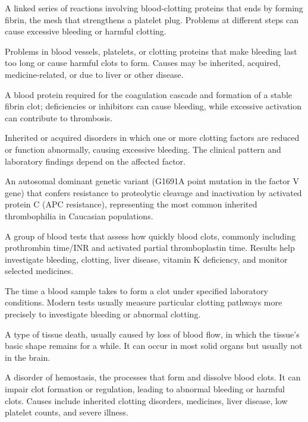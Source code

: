  A linked series of reactions involving blood-clotting proteins that ends by forming fibrin, the mesh that strengthens a platelet plug. Problems at different steps can cause excessive bleeding or harmful clotting.

 Problems in blood vessels, platelets, or clotting proteins that make bleeding last too long or cause harmful clots to form. Causes may be inherited, acquired, medicine-related, or due to liver or other disease.

 A blood protein required for the coagulation cascade and formation of a stable fibrin clot; deficiencies or inhibitors can cause bleeding, while excessive activation can contribute to thrombosis.

 Inherited or acquired disorders in which one or more clotting factors are reduced or
function abnormally, causing excessive bleeding. The clinical pattern and laboratory
findings depend on the affected factor.

 An autosomal dominant genetic variant (G1691A point mutation in the factor V gene) that confers resistance to proteolytic cleavage and inactivation by activated protein C (APC resistance), representing the most common inherited thrombophilia in Caucasian populations.

 A group of blood tests that assess how quickly blood clots, commonly including prothrombin time/INR and activated partial thromboplastin time. Results help investigate bleeding, clotting, liver disease, vitamin K deficiency, and monitor selected medicines.

 The time a blood sample takes to form a clot under specified laboratory conditions. Modern tests usually measure particular clotting pathways more precisely to investigate bleeding or abnormal clotting.

 A type of tissue death, usually caused by loss of blood flow, in which the tissue's basic shape remains for a while. It can occur in most solid organs but usually not in the brain.

 A disorder of hemostasis, the processes that form and dissolve blood clots. It can impair clot formation or regulation, leading to abnormal bleeding or harmful clots. Causes include inherited clotting disorders, medicines, liver disease, low platelet counts, and severe illness.

